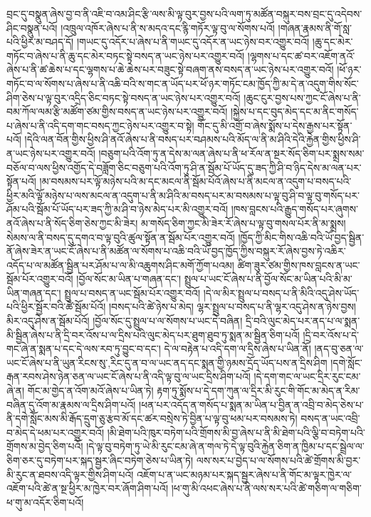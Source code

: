 བྲང་དུ་བསྣུན་ཞེས་བྱ་བ་ནི་འཇི་བ་འམ་ཤིང་རྩི་ལས་མི་ལྟ་བུར་བྱས་པའི་ལག་ཏུ་མཚོན་བསྐུར་བས་བྲང་དུ་འདེབས་ཤིང་བསྣུན་པའོ། །འཁྲུལ་འཁོར་ཞེས་པ་ནི་ས་མདའ་དང་རྙི་གཏོར་ལྟ་བུ་ལ་སོགས་པའོ། །གཞན་རྣམས་ནི་གོ་སླ་པའི་ཕྱིར་མ་བཤད་དོ། །གཡང་དུ་འདོར་པ་ཞེས་པ་ནི་གཡང་དུ་འདོར་ན་ཡང་ཉེས་བར་འགྱུར་བའོ། །ཆུ་དང་མེར་གཏོང་བ་ཞེས་པ་ནི་ཆུ་དང་མེར་བཏང་སྟེ་བསད་ན་ཡང་ཉེས་པར་འགྱུར་བའོ། །ལྷགས་པ་དང་ཚ་བར་འཇོག་ནའོ་ཞེས་པ་ནི་ཚ་ཆེས་པ་དང་ལྷགས་པ་ཆེ་ཆེས་པར་བཟུང་སྟེ་བཞག་ནས་བསད་ན་ཡང་ཉེས་པར་འགྱུར་བའོ། །ཕོ་ཉར་གཏོང་བ་ལ་སོགས་པ་ཞེས་པ་ནི་འཆི་བའི་ས་གང་ན་ཡོད་པར་ཕོ་ཉར་གཏོང་ངམ་ཁྱོད་ཀྱི་མ་དེ་ན་འདུག་གིས་སོང་ཤིག་ཅེས་པ་ལྟ་བུར་འདྲིད་ཅིང་བཏང་སྟེ་བསད་ན་ཡང་ཉེས་པར་འགྱུར་བའོ། །ཆུང་ངུར་བྱས་པས་ཀྱང་ངོ་ཞེས་པ་ནི་བམ་ཀོལ་ལམ་རྩི་མཚོག་ཙམ་གྱིས་བསད་ན་ཡང་ཉེས་པར་འགྱུར་བའོ། །སྐྱེས་པ་དང་བུད་མེད་དང་མ་ནིང་གསོད་པ་ཞེས་པ་ནི་འདི་དག་གང་བསད་ཀྱང་ཉེས་པར་འགྱུར་བ་སྟེ། གོང་དུ་མི་འགྲོ་བ་ཞེས་སྨོས་པ་དེས་རྒྱས་པར་སྟོན་པའོ། །དེའི་ལན་བོན་གྱིས་ཕྱིས་ཤི་ནའོ་ཞེས་པ་ནི་བསད་པར་བཤམས་པའི་མོད་ལ་ནི་མ་ཤིའི་དེའི་རྐྱེན་གྱིས་ཕྱིས་ཤི་ན་ཡང་ཉེས་པར་འགྱུར་བའོ། །བཅུག་པའི་འོག་ཏུ་ན་དེས་མ་ལན་ཞེས་པ་ནི་ཕ་རོལ་ན་སྔར་སོད་ཅིག་པར་སྨྲས་སམ་བཅོལ་བ་ལས་ཕྱིས་འགྱོད་དེ་བཟློག་ཅིང་བཅུག་པའི་འོག་ཏུ་ཤི་ན་སྦོམ་པོ་ཡོད་དུ་ཟད་ཀྱི་ཤི་བ་ཉིད་དེས་མ་ལན་པར་སྟོན་པའོ། །མ་བསམས་པར་ལྟོ་མཉེས་པའི་མ་དང་མངལ་ནི་སྦོམ་པོའོ་ཞེས་པ་ནི་མངལ་ན་འདུག་པ་བསད་པའི་ཕྱིར་མའི་ལྟོ་མཉེས་པ་ལས་མངལ་ན་འདུག་པ་ནི་མ་ཤིའི་མ་བསད་པར་མ་བསམས་པ་ལྟ་བུ་ཤི་བ་ལྟ་བུ་གསོད་པར་ཤོམ་པའི་སྦོམ་པོ་ཡོད་པར་ཟད་ཀྱི་མ་ཤི་བ་ཉེས་མེད་པར་མི་འགྱུར་བའོ། །ཁས་བླངས་པའི་རྒྱུད་གསོད་པར་ཞུགས་ནའོ་ཞེས་པ་ནི་སོད་ཅིག་ཅེས་ཀྱང་མི་ཟེར། མ་གསོད་ཅིག་ཀྱང་མི་ཟེར་རོ་ཞེས་པ་ལྟ་བུ་གསལ་པོར་ནི་མ་སྨྲས། སེམས་ལ་ནི་བསད་དུ་དགའ་བ་ལྟ་བུའི་ཚུལ་སྟོན་ན་སྦོམ་པོར་འགྱུར་བའོ། །ཁྱོད་ཀྱི་མིང་གིས་འཆི་བའི་ཡོ་བྱད་སྦྱིན་ནོ་ཞེས་ཟེར་ན་ཡང་ངོ་ཞེས་པ་ནི་མཚོན་ལ་སོགས་པ་འཆི་བའི་ཡོ་བྱད་ཁྱོད་ཀྱིས་བསྐུར་རོ་ཞེས་བྱས་ཏེ་འཆིར་འདོད་པ་ལ་མཚོན་སྦྱིན་པར་ཤོམ་པ་ལ་མི་འཆུགས་ཤིང་མགོ་ཀྱོག་པའམ། ཚིག་ཟུར་ཙམ་གྱིས་ཁས་བླངས་ན་ཡང་སྦོམ་པོར་འགྱུར་བའོ། །བྱོལ་སོང་མ་ཡིན་པ་གཞན་དང་། སྤྲུལ་པ་ཡང་ངོ་ཞེས་པ་ནི་བྱོལ་སོང་མ་ཡིན་པའི་མི་མ་ཡིན་གཞན་དང་། སྤྲུལ་པ་བསད་ན་ཡང་སྦོམ་པོར་འགྱུར་བའོ། །དེ་ལ་མིར་སྤྲུལ་པ་བསད་པ་ནི་མིའི་འདུ་ཤེས་ཡོད་པའི་ཕྱིར་སྦྱོར་བའི་ཚེ་སྦོམ་པོའོ། །བསད་པའི་ཚེ་ཉེས་པ་མེད། ལྷར་སྤྲུལ་པ་བསད་པ་ནི་ལྷར་འདུ་ཤེས་ན་ཉེས་བྱས། མིར་འདུ་ཤེས་ན་སྦོམ་པོའོ། །བྱོལ་སོང་དུ་སྤྲུལ་པ་ལ་སོགས་པ་ཡང་དེ་བཞིན། དྲི་བའི་ལུང་མེད་པར་ནད་པ་ལ་སྨན་མི་སྦྱིན་ཞེས་པ་ནི་དྲི་བར་འོས་པ་ལ་དྲིས་པའི་ལུང་མེད་པར་ཐུག་ཐུབ་ཏུ་སྨན་མ་སྦྱིན་ཅིག་པའོ། །དྲི་བར་འོས་པ་དེ་གང་ཞེ་ན་སྨན་པ་དང་དེ་ལས་རབ་ཏུ་བྱུང་བ་དང་། དེ་ལ་བརྟེན་པ་འདི་དག་ལ་དྲིས་ཞེས་པ་ཡིན་ནོ། །ནད་བུ་ཅན་ལ་ཡང་ངོ་ཞེས་པ་ནི་ཡུན་{རིངས་སུ་,རིང་དུ་}ན་བ་ལ་ཡང་ནད་དང་སྨན་གྱི་ཉམས་དྲོད་ཡོད་པས་ན་དྲིས་ཤིག །དགེ་སློང་རྒན་རབས་ཤེས་ཉེན་ཅན་ལ་ཡང་ངོ་ཞེས་པ་ནི་འདི་ལྟ་བུ་ལ་ཡང་དྲིས་ཤིག་པའོ། །དེ་དག་གང་ལ་ཡང་དྲིར་རུང་ངམ་ཞེ་ན། གོང་མ་གྱེད་ན་འོག་མའོ་ཞེས་པ་ཡིན་ཏེ། རྟག་ཏུ་སྨོས་པ་དེ་དག་ཀུན་ལ་དྲིར་མི་རུང་གི་གོང་མ་མེད་ན་རིམ་བཞིན་དུ་འོག་མ་རྣམས་ལ་དྲིས་ཤིག་པའོ། །ཕན་པར་འདོད་ན་གསོད་པ་སྨན་མ་ཡིན་པ་བྱིན་ན་འབྲི་བ་མེད་ཅེས་པ་ནི་དགེ་སློང་མས་མི་རྒོད་དྲུག་ཅུ་རྩབ་མོ་དང་ཚར་བསྲེས་ཏེ་བྱིན་པ་ལྟ་བུ་ཕམ་པར་བསམས་ཏེ། བསད་ན་ཡང་འབྲི་བ་མེད་དེ་ཕམ་པར་འགྱུར་བའོ། །མི་ཐེག་པའི་ཁུར་བཏེག་པའི་གྲོགས་མི་བྱ་ཞེས་པ་ནི་མི་ཐེག་པའི་ལྕི་བ་བཏེག་པའི་གྲོགས་མ་བྱེད་ཅིག་པའོ། །དེ་ལྟ་བུ་བཏེག་ཏུ་ཡེ་མི་རུང་ངམ་ཞེ་ན་གལ་ཏེ་དེ་ལྟ་བུའི་རྐྱེན་ཅིག་ན་ཁྱིམ་པ་དང་སྦྲེལ་ལ་ཅིག་ཅར་དུ་བཏེག་པར་སྐད་སྦྱར་ཞིང་བཏེག་ཅེས་པ་ཡིན་ཏེ། ལས་སར་པ་བྱེད་པ་ལ་སོགས་པའི་ཚེ་གྲོགས་མི་བྱར་མི་རུང་ན་ཐབས་འདི་ལྟར་གྱིས་ཤིག་པའོ། འཇོག་པ་ན་ཡང་མཉམ་པར་སྐད་སྦྱར་ཞེས་པ་ནི་གོང་མ་ལྟར་ཁྱེར་ལ་འཇོག་པའི་ཚེ་ན་སྔ་ཕྱིར་མ་ཁྱེར་བར་ཞོག་ཤིག་པའོ། །ཕ་གུ་མི་འཕང་ཞེས་པ་ནི་ལས་སར་པའི་ཚེ་གཅིག་ལ་གཅིག་ཕ་གུ་མ་འདོར་ཅིག་པའོ། 